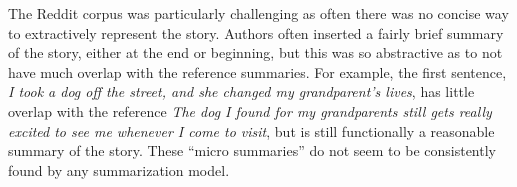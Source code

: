 The Reddit corpus was particularly challenging as often there was no concise
way to extractively represent the story. Authors often inserted a 
fairly brief summary of the story, either at the end or beginning, but
this was so abstractive as to not have much overlap with the reference
summaries. For example, the first sentence, \textit{I took a dog off the street, and she changed my grandparent's lives}, has little overlap with the reference
\textit{The dog I found for my grandparents still gets really excited to see
me whenever I come to visit}, but is still functionally a reasonable 
summary of the story. These ``micro summaries'' do not seem to be 
consistently found by any summarization model. 



